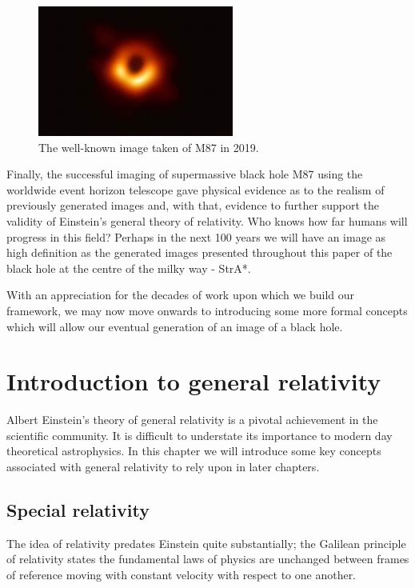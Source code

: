 \documentclass[oneside,openright,frontopenright, singlespacing]{dmathesis}
\begin{document}
\begin{figure}[!ht]
	\centering
	\includegraphics[width=0.45\linewidth]{img/M87}
	\caption{The well-known image taken of M87 in 2019. \cite{event2019first}}
	\label{fig:Figure1.3}
\end{figure}

	Finally, the successful imaging of supermassive black hole M87 using the worldwide event horizon telescope\cite{event2019first} gave physical evidence as to the realism of previously generated images and, with that, evidence to further support the validity of Einstein's general theory of relativity. Who knows how far humans will progress in this field? Perhaps in the next 100 years we will have an image as high definition as the generated images presented throughout this paper of the black hole at the centre of the milky way - StrA*.

\vspace{1em}
	With an appreciation for the decades of work upon which we build our framework, we may now move onwards to introducing some more formal concepts which will allow our eventual generation of an image of a black hole.





\chapter{Introduction to general relativity}\label{chap:Chapter2}
	Albert Einstein’s theory of general relativity is a pivotal achievement in the scientific community. It is difficult to understate its importance to modern day theoretical astrophysics. In this chapter we will introduce some key concepts associated with general relativity to rely upon in later chapters.

\section{Special relativity}\label{sec:Section2.1}

	The idea of relativity predates Einstein quite substantially; the Galilean principle of relativity states the fundamental laws of physics are unchanged between frames of reference moving with constant velocity with respect to one another.
\end{document}
